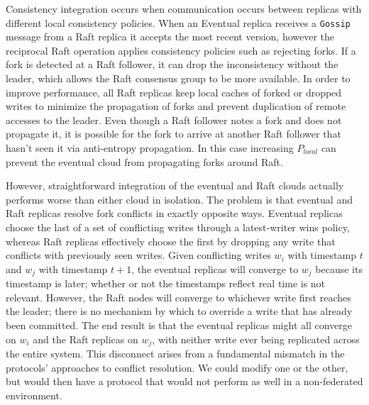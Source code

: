 \documentclass[10pt,conference,letterpaper]{IEEEtran}
\begin{document}
Consistency integration occurs when communication occurs between replicas with different
local consistency policies.
When an Eventual replica receives a \texttt{Gossip} message from a Raft replica it
accepts the most recent version, however the reciprocal Raft operation applies
consistency policies such as rejecting forks.
If a fork is detected at a Raft follower, it can drop the inconsistency without
the leader, which allows the Raft consensus group to be more available.
In order to improve performance, all Raft replicas keep local caches of forked or dropped
writes to minimize the propagation of forks and prevent duplication of remote accesses to
the leader.
Even though a Raft follower notes a fork and does not propagate it, it is possible for
the fork to arrive at another Raft follower that hasn't seen it via anti-entropy
propagation.
In this case increasing $P_{local}$ can prevent the eventual cloud from propagating forks
around Raft.

However, straightforward integration of the eventual and Raft clouds actually performs worse
than either cloud in isolation.
The problem is that eventual and Raft replicas resolve fork conflicts in exactly opposite
ways.
Eventual replicas choose the last of a set of conflicting writes through a latest-writer
wins policy, whereas Raft replicas effectively choose the first by dropping any write that
conflicts with previously seen writes.
Given conflicting writes $w_i$ with timestamp $t$ and $w_j$ with timestamp $t+1$, the
eventual replicas will converge to $w_j$ because its timestamp is later; whether or not
the timestamps reflect real time is not relevant.
However, the Raft nodes will converge to whichever write first reaches the leader; there
is no mechanism by which to override a write that has already been committed.
The end result is that the eventual replicas might all converge on $w_i$ and the Raft
replicas on $w_j$, with neither write ever being replicated across the entire system.
This disconnect arises from a fundamental mismatch in the protocols' approaches to
conflict resolution.
We could modify one or the other, but would then have a protocol that would not perform as
well in a non-federated environment.
\end{document}

